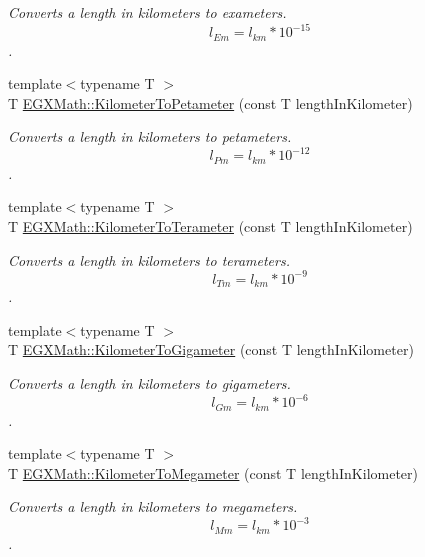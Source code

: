 \begin{DoxyCompactItemize}
\begin{DoxyCompactList}\small\item\em Converts a length in kilometers to exameters. \[ l_{Em}=l_{km} * 10^{-15} \]. \end{DoxyCompactList}\item 
{\footnotesize template$<$typename T $>$ }\\T \mbox{\hyperlink{group___e_g_x_math-_conversions-_length_conversions-_s_i-_kilometer-_s_i_ga79a0e22448e08eeb755577316635058a}{E\+G\+X\+Math\+::\+Kilometer\+To\+Petameter}} (const T length\+In\+Kilometer)
\begin{DoxyCompactList}\small\item\em Converts a length in kilometers to petameters. \[ l_{Pm}=l_{km} * 10^{-12} \]. \end{DoxyCompactList}\item 
{\footnotesize template$<$typename T $>$ }\\T \mbox{\hyperlink{group___e_g_x_math-_conversions-_length_conversions-_s_i-_kilometer-_s_i_gadc147bd94e976f0577e7ca544ed81bf9}{E\+G\+X\+Math\+::\+Kilometer\+To\+Terameter}} (const T length\+In\+Kilometer)
\begin{DoxyCompactList}\small\item\em Converts a length in kilometers to terameters. \[ l_{Tm}=l_{km} * 10^{-9} \]. \end{DoxyCompactList}\item 
{\footnotesize template$<$typename T $>$ }\\T \mbox{\hyperlink{group___e_g_x_math-_conversions-_length_conversions-_s_i-_kilometer-_s_i_gafab6496ea68973d69b855d445c8a62a8}{E\+G\+X\+Math\+::\+Kilometer\+To\+Gigameter}} (const T length\+In\+Kilometer)
\begin{DoxyCompactList}\small\item\em Converts a length in kilometers to gigameters. \[ l_{Gm}=l_{km} * 10^{-6} \]. \end{DoxyCompactList}\item 
{\footnotesize template$<$typename T $>$ }\\T \mbox{\hyperlink{group___e_g_x_math-_conversions-_length_conversions-_s_i-_kilometer-_s_i_gacfeaef9cf345a9907addb7989eb11034}{E\+G\+X\+Math\+::\+Kilometer\+To\+Megameter}} (const T length\+In\+Kilometer)
\begin{DoxyCompactList}\small\item\em Converts a length in kilometers to megameters. \[ l_{Mm}=l_{km} * 10^{-3} \]. \end{DoxyCompactList}\item 

\end{DoxyCompactItemize}
